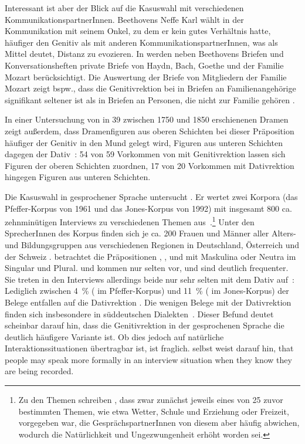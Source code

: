 Interessant ist aber der Blick auf die Kasuswahl mit verschiedenen KommunikationspartnerInnen. 
Beethovens Neffe Karl wählt in der Kommunikation mit seinem Onkel, zu dem er kein gutes Verhältnis hatte, häufiger den Genitiv als mit anderen KommunikationspartnerInnen, was \citet[s.][29]{Sato.2015} als Mittel deutet, Distanz zu evozieren. 
In \citet{Sato.2022} werden neben Beethovens Briefen und Konversationsheften private Briefe von Haydn, Bach, Goethe und der Familie Mozart berücksichtigt.
Die Auswertung der Briefe von Mitgliedern der Familie Mozart zeigt bspw., dass die Genitivrektion bei \wegen{} in Briefen an Familienangehörige signifikant seltener ist als in Briefen an Personen, die nicht zur Familie gehören \citep[s.][96--97]{Sato.2022}. 

In einer Untersuchung von \wegen{} in 39 zwischen 1750 und 1850 erschienenen Dramen zeigt \citet[]{Sato.2016} außerdem, dass Dramenfiguren aus oberen Schichten bei dieser Präposition h{\"a}ufiger der Genitiv in den Mund gelegt wird, Figuren aus unteren Schichten dagegen der Dativ~\citep[s.][409]{Sato.2016}: 
54 von 59 Vorkommen von \wegen{} mit Genitivrektion lassen sich Figuren der oberen Schichten zuordnen, 17 von 20 Vorkommen mit Dativrektion hingegen Figuren aus unteren Schichten.

Die Kasuswahl in gesprochener Sprache untersucht \citet[]{Petig1997}. 
Er wertet zwei Korpora (das Pfeffer-Korpus von 1961 und das Jones-Korpus von 1992) mit insgesamt 800 ca. zehnminütigen Interviews zu verschiedenen Themen aus~\citep[s.][36]{Petig1997}.\footnote{Zu den Themen schreiben \citet[17]{Pfeffer.1984}, dass zwar zunächst jeweils eines von 25 zuvor bestimmten Themen, wie etwa Wetter, Schule und Erziehung oder Freizeit, vorgegeben war, die GesprächspartnerInnen von diesem aber häufig abwichen, wodurch \glqq die Natürlichkeit und Ungezwungenheit erhöht\grqq{} worden sei.} 
Unter den SprecherInnen des Korpus finden sich je ca. 200 Frauen und Männer aller Alters- und Bildungsgruppen aus verschiedenen Regionen in Deutschland, {\"O}sterreich und der Schweiz \citep[s.][17]{Pfeffer.1984}. 
\citeauthor{Petig1997} betrachtet die Präpositionen , ,  und  mit Maskulina oder Neutra im Singular und Plural. 
 und  kommen nur selten vor, \wegen{} und \waehrend{} sind deutlich frequenter. 
Sie treten in den Interviews allerdings beide nur sehr selten mit dem Dativ auf~\citep[s.][37]{Petig1997}: 
Lediglich zwischen 4~\% (\waehrend{} im Pfeffer-Korpus) und 11~\% (\wegen{} im Jones-Korpus) der Belege entfallen auf die Dativrektion \citep[s.][37]{Petig1997}. 
Die wenigen Belege mit der Dativrektion finden sich insbesondere in s{\"u}ddeutschen Dialekten~\citep[s.][38]{Petig1997}. 
Dieser Befund deutet scheinbar darauf hin, dass die Genitivrektion in der gesprochenen Sprache die deutlich häufigere Variante ist. 
Ob dies jedoch auf natürliche Interaktionssituationen übertragbar ist, ist fraglich. 
\citet[37]{Petig1997} selbst weist darauf hin, \glqq that people may speak more formally in an interview situation when they know they are being recorded.\grqq{}

